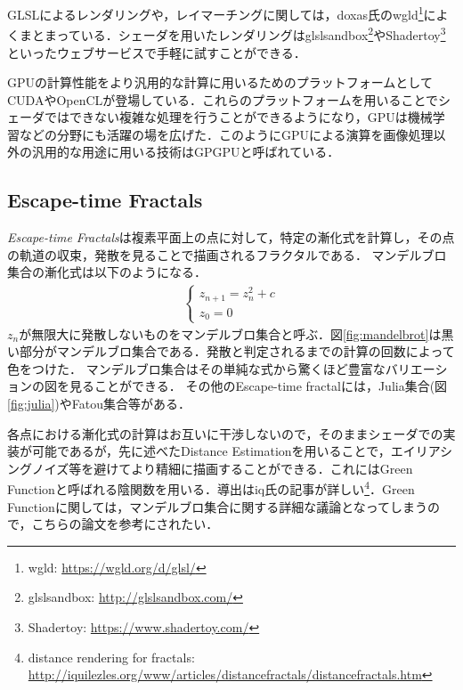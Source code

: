 GLSLによるレンダリングや，レイマーチングに関しては，doxas氏のwgld\footnote{wgld: \url{https://wgld.org/d/glsl/}}によくまとまっている．シェーダを用いたレンダリングはglslsandbox\footnote{glslsandbox: \url{http://glslsandbox.com/}}やShadertoy\footnote{Shadertoy: \url{https://www.shadertoy.com/}}といったウェブサービスで手軽に試すことができる．

GPUの計算性能をより汎用的な計算に用いるためのプラットフォームとしてCUDAやOpenCLが登場している．これらのプラットフォームを用いることでシェーダではできない複雑な処理を行うことができるようになり，GPUは機械学習などの分野にも活躍の場を広げた．このようにGPUによる演算を画像処理以外の汎用的な用途に用いる技術はGPGPUと呼ばれている．

\subsection{Escape-time Fractals}
{\it Escape-time Fractals}は複素平面上の点に対して，特定の漸化式を計算し，その点の軌道の収束，発散を見ることで描画されるフラクタルである．
マンデルブロ集合の漸化式は以下のようになる．
\begin{eqnarray*}
 \begin{cases}
  z_{n+1} = z^2_{n} + c \\ z_0 = 0
 \end{cases}
\end{eqnarray*}
$z_n$が無限大に発散しないものをマンデルブロ集合と呼ぶ．図\ref{fig:mandelbrot}は黒い部分がマンデルブロ集合である．発散と判定されるまでの計算の回数によって色をつけた．
マンデルブロ集合はその単純な式から驚くほど豊富なバリエーションの図を見ることができる．
その他のEscape-time fractalには，Julia集合(図\ref{fig:julia})やFatou集合等がある．

各点における漸化式の計算はお互いに干渉しないので，そのままシェーダでの実装が可能であるが，先に述べたDistance Estimationを用いることで，エイリアシングノイズ等を避けてより精細に描画することができる．これにはGreen Functionと呼ばれる陰関数を用いる．導出はiq氏の記事が詳しい\footnote{distance rendering for fractals: \url{http://iquilezles.org/www/articles/distancefractals/distancefractals.htm}}．Green Functionに関しては，マンデルブロ集合に関する詳細な議論となってしまうので，こちらの論文\cite{mandelbrot}を参考にされたい．

